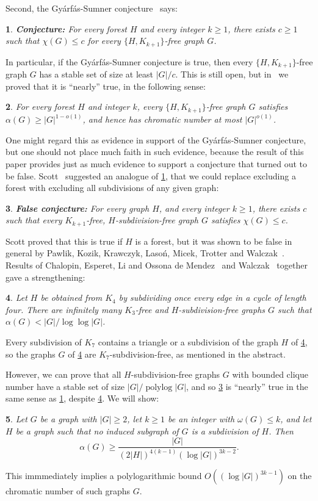 \documentclass[titlepage,11pt]{article}
\newtheorem{thm}{}[section]
\begin{document}
Second, the Gy\'arf\'as-Sumner conjecture~\cite{gyarfastree, sumner} says:
\begin{thm}\label{GSconj}
{\bf Conjecture: }For every forest $H$ and every integer $k\ge 1$, there exists $c\ge 1$ such that $\chi(G)\le c$ for every $\{H,K_{k+1}\}$-free graph $G$.
\end{thm}
In particular, 
if the Gy\'arf\'as-Sumner conjecture is true, then every $\{H,K_{k+1}\}$-free graph $G$
has a stable set of size at least $|G|/c$. This is still open, but in~\cite{stable1} we proved that it is ``nearly'' true, in the following sense:
\begin{thm}\label{stable1}
For every forest $H$ and integer $k$, every $\{H,K_{k+1}\}$-free graph $G$ satisfies $\alpha(G)\ge |G|^{1-o(1)}$,
and hence has chromatic number at most $|G|^{o(1)}$.
\end{thm}

One might regard this as evidence in support of the Gy\'arf\'as-Sumner conjecture, but one should not place much faith in 
such evidence, because the result of this paper provides just as much evidence to support a conjecture that turned out to be false.
Scott~\cite{scott} suggested an analogue of \ref{GSconj}, that we could replace excluding a forest with excluding all subdivisions of any given graph:
\begin{thm}\label{scottconj}
{\bf False conjecture: }For every graph $H$, and every integer $k\ge 1$, there exists $c$ such that every $K_{k+1}$-free, $H$-subdivision-free graph $G$ satisfies $\chi(G)\le c$.
\end{thm}
Scott proved that this is true if $H$ is a forest, but 
it was shown to be false in general by Pawlik, Kozik, Krawczyk, Laso\'{n},
Micek, Trotter and Walczak~\cite{sevenpoles}. Results of 
Chalopin, Esperet, Li and Ossona de Mendez~\cite{chandeliers} and Walczak~\cite{walczak} together gave a strengthening:
\begin{thm}\label{walczak}
Let $H$ be obtained from $K_4$ by subdividing once every edge in a cycle of length four. There are infinitely many $K_3$-free and 
$H$-subdivision-free graphs $G$ such that $\alpha(G)<|G|/\log\log|G|$.
\end{thm}
Every subdivision of $K_7$ contains a triangle or a subdivision of the graph $H$ of 
\ref{walczak}, so the graphs $G$ of \ref{walczak} are $K_7$-subdivision-free, as mentioned in the abstract.

However, we can prove that all $H$-subdivision-free graphs $G$ with bounded clique number 
have a stable set of size 
$|G|/\operatorname{polylog}|G|$, and so
\ref{scottconj} is ``nearly'' true in the same sense as \ref{GSconj}, despite \ref{walczak}.
We will show:
\begin{thm} \label{subdivision4again}
Let $G$ be a graph with $|G|\ge 2$, let $k\ge 1$ be an integer with $\omega(G)\le k$, and let $H$ be a graph 
such that no induced subgraph of $G$
is a subdivision of $H$.  Then
$$\alpha(G)\ge \frac{|G|}{(2|H|)^{4(k-1)}(\log |G|)^{3k-2}}.$$
\end{thm}
This immmediately implies a polylogarithmic bound $O((\log |G|)^{3k-1})$ on the chromatic number of such graphs $G$.
\end{document}
